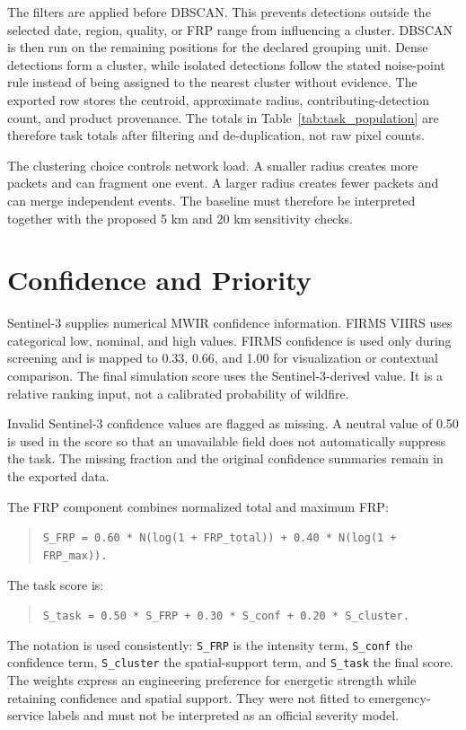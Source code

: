 The filters are applied before DBSCAN. This prevents detections outside the selected date, region, quality, or FRP range from influencing a cluster. DBSCAN is then run on the remaining positions for the declared grouping unit. Dense detections form a cluster, while isolated detections follow the stated noise-point rule instead of being assigned to the nearest cluster without evidence. The exported row stores the centroid, approximate radius, contributing-detection count, and product provenance. The totals in Table~\ref{tab:task_population} are therefore task totals after filtering and de-duplication, not raw pixel counts.

The clustering choice controls network load. A smaller radius creates more packets and can fragment one event. A larger radius creates fewer packets and can merge independent events. The baseline must therefore be interpreted together with the proposed 5 km and 20 km sensitivity checks.

\section{Confidence and Priority}
Sentinel-3 supplies numerical MWIR confidence information. FIRMS VIIRS uses categorical low, nominal, and high values. FIRMS confidence is used only during screening and is mapped to 0.33, 0.66, and 1.00 for visualization or contextual comparison. The final simulation score uses the Sentinel-3-derived value. It is a relative ranking input, not a calibrated probability of wildfire.

Invalid Sentinel-3 confidence values are flagged as missing. A neutral value of 0.50 is used in the score so that an unavailable field does not automatically suppress the task. The missing fraction and the original confidence summaries remain in the exported data.

The FRP component combines normalized total and maximum FRP:

\begin{quote}\texttt{S\_FRP = 0.60 * N(log(1 + FRP\_total)) + 0.40 * N(log(1 + FRP\_max)).}\end{quote}
The task score is:

\begin{quote}\texttt{S\_task = 0.50 * S\_FRP + 0.30 * S\_conf + 0.20 * S\_cluster.}\end{quote}
The notation is used consistently: \texttt{S\_FRP} is the intensity term, \texttt{S\_conf} the confidence term, \texttt{S\_cluster} the spatial-support term, and \texttt{S\_task} the final score. The weights express an engineering preference for energetic strength while retaining confidence and spatial support. They were not fitted to emergency-service labels and must not be interpreted as an official severity model.

